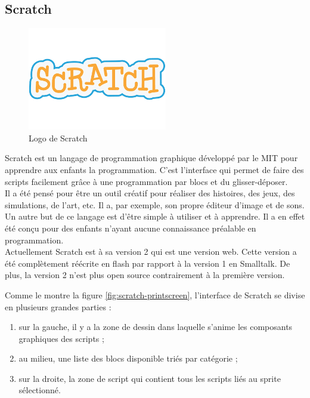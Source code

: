 \subsection{Scratch}

\begin{figure}[!ht]
  \begin{center}
    \includegraphics[scale=0.4]{content/5-related_work/images/scratch}
    \caption{Logo de Scratch}
    \label{fig:scratch}
  \end{center}
\end{figure}
Scratch \cite{scratch} est un langage de programmation graphique développé par le MIT pour apprendre aux enfants la programmation. C'est l'interface qui permet de faire des scripts facilement grâce à une programmation par blocs et du glisser-déposer.\\

Il a été pensé pour être un outil créatif pour réaliser des histoires, des jeux, des simulations, de l'art, etc. Il a, par exemple, son propre éditeur d'image et de sons. Un autre but de ce langage est d'être simple à utiliser et à apprendre. Il a en effet été conçu pour des enfants n'ayant aucune connaissance préalable en programmation.\\

Actuellement Scratch est à sa version 2 qui est une version web. Cette version a été complètement réécrite en flash par rapport à la version 1 en Smalltalk. De plus, la version 2 n'est plus open source contrairement à la première version.

Comme le montre la figure \ref{fig:scratch-printscreen}, l'interface de Scratch se divise en plusieurs grandes parties :

\begin{enumerate}
\item sur la gauche, il y a la zone de dessin dans laquelle s'anime les composants graphiques des scripts ;
\item au milieu, une liste des blocs disponible triés par catégorie ;
\item sur la droite, la zone de script qui contient tous les scripts liés au sprite sélectionné.
\end{enumerate}

